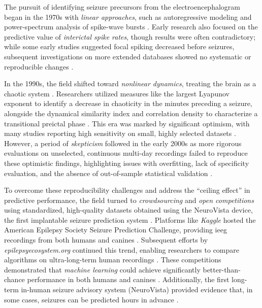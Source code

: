 The pursuit of identifying seizure precursors from the electroencephalogram began in the 1970s with \textit{linear approaches}, such as autoregressive modeling and power-spectrum analysis of spike-wave bursts \parencite{mormann_seizure_2007}.
Early research also focused on the predictive value of \textit{interictal spike rates}, though results were often contradictory; while some early studies suggested focal spiking decreased before seizures, subsequent investigations on more extended databases showed no systematic or reproducible changes \parencite{mormann_seizure_2007}.

In the 1990s, the field shifted toward \textit{nonlinear dynamics}, treating the brain as a chaotic system \parencite{mormann_seizure_2007, kuhlmann_epilepsyecosystemorg_2018}.
Researchers utilized measures like the largest Lyapunov exponent to identify a decrease in chaoticity in the minutes preceding a seizure, alongside the dynamical similarity index and correlation density to characterize a transitional preictal phase \parencite{mormann_seizure_2007}.
This era was marked by significant optimism, with many studies reporting high sensitivity on small, highly selected datasets \parencite{mormann_seizure_2007, muller_coherent_2022}.
However, a period of \textit{skepticism} followed in the early 2000s as more rigorous evaluations on unselected, continuous multi-day recordings failed to reproduce these optimistic findings, highlighting issues with overfitting, lack of specificity evaluation, and the absence of out-of-sample statistical validation \parencite{mormann_seizure_2007, freestone_forward-looking_2017}.

To overcome these reproducibility challenges and address the \enquote{ceiling effect} in predictive performance, the field turned to \textit{crowdsourcing} and \textit{open competitions} using standardized, high-quality datasets obtained using the NeuroVista device, the first implantable seizure prediction system \parencite{cook_prediction_2013}. 
Platforms like \textit{Kaggle} hosted the American Epilepsy Society Seizure Prediction Challenge, providing \gls{ieeg} recordings from both humans and canines \parencite{brinkmann_crowdsourcing_2016}.
Subsequent efforts by \textit{epilepsyecosystem.org} continued this trend, enabling researchers to compare algorithms on ultra-long-term human recordings \parencite{kuhlmann_epilepsyecosystemorg_2018}.
These competitions demonstrated that \textit{machine learning} could achieve significantly better-than-chance performance in both humans and canines \parencite{brinkmann_crowdsourcing_2016}.
Additionally, the first long-term in-human seizure advisory system (NeuroVista) provided evidence that, in some cases, seizures can be predicted hours in advance \parencite{cook_prediction_2013}.

